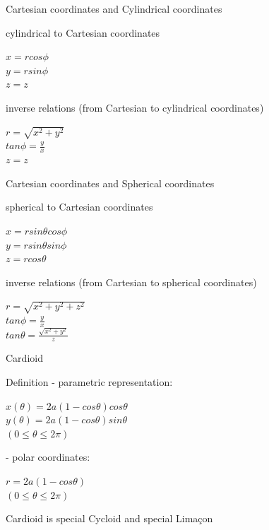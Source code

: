\documentclass{beamer}
\begin{document}
\begin{frame}{Cartesian coordinates and Cylindrical coordinates}
    \begin{block}{cylindrical to Cartesian coordinates}
    \begin{center}
        $x=r cos \phi$\\
        $y=r sin \phi$\\
        $z=z$
    \end{center}
    \end{block}
    \begin{block}{inverse relations (from Cartesian to cylindrical coordinates) }
    \begin{center}
        $r=\sqrt{x^2+y^2}$\\
        $tan \phi=\frac{y}{x}$\\
        $z=z$
    \end{center}
    \end{block}
\end{frame}

\begin{frame}{Cartesian coordinates and Spherical coordinates}
    \begin{block}{spherical to Cartesian coordinates}
    \begin{center}
        $x=r sin \theta cos \phi$\\
        $y=r sin\theta sin \phi$\\
        $z=r cos\theta$
    \end{center}
    \end{block}
    \begin{block}{inverse relations (from Cartesian to spherical coordinates) }
    \begin{center}
        $r=\sqrt{x^2+y^2+z^2}$\\
        $tan \phi=\frac{y}{x}$\\
        $tan \theta=\frac{\sqrt{x^2+y^2}}{z}$
    \end{center}
    \end{block}
\end{frame}

\begin{frame}{Cardioid}
    \begin{block}{Definition}
- parametric representation:
\begin{center}
    $x(\theta)=2a(1-cos \theta)cos \theta$\\
    $y(\theta)=2a(1-cos \theta)sin \theta$\\
    $(0\leqslant \theta \leqslant 2\pi)$
\end{center}
- polar coordinates:
\begin{center}
    $r =2a(1-cos \theta)$\\
    $(0\leqslant \theta \leqslant 2\pi)$
\end{center}
Cardioid is special Cycloid and special Limaçon
    \end{block}
\end{frame}
\end{document}
